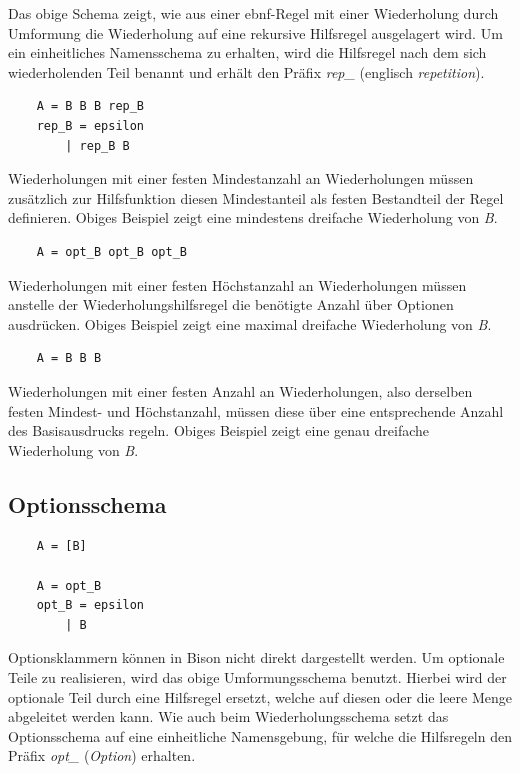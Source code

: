 \documentclass[oneside]{ausarbeitung}
\begin{document}
Das obige Schema zeigt, wie aus einer \ac{ebnf}-Regel mit einer Wiederholung durch Umformung die Wiederholung auf eine rekursive Hilfsregel ausgelagert wird. Um ein einheitliches Namensschema zu erhalten, wird die Hilfsregel nach dem sich wiederholenden Teil benannt und erhält den Präfix \textit{rep\_} (englisch \textit{repetition}).


\begin{lstlisting}
	A = B B B rep_B
	rep_B = epsilon
		| rep_B B
\end{lstlisting}

Wiederholungen mit einer festen Mindestanzahl an Wiederholungen müssen zusätzlich zur Hilfsfunktion diesen Mindestanteil als festen Bestandteil der Regel definieren. Obiges Beispiel zeigt eine mindestens dreifache Wiederholung von \textit{B}.


\begin{lstlisting}
	A = opt_B opt_B opt_B
\end{lstlisting}

Wiederholungen mit einer festen Höchstanzahl an Wiederholungen müssen anstelle der Wiederholungshilfsregel die benötigte Anzahl über Optionen ausdrücken. Obiges Beispiel zeigt eine maximal dreifache Wiederholung von \textit{B}.

\begin{lstlisting}
	A = B B B
\end{lstlisting}

Wiederholungen mit einer festen Anzahl an Wiederholungen, also derselben festen Mindest- und Höchstanzahl, müssen diese über eine entsprechende Anzahl des Basisausdrucks regeln. Obiges Beispiel zeigt eine genau dreifache Wiederholung von \textit{B}.

\subsection{Optionsschema}

\begin{lstlisting}
	A = [B]
	
	A = opt_B
	opt_B = epsilon
		| B
\end{lstlisting}

Optionsklammern können in Bison nicht direkt dargestellt werden. Um optionale Teile zu realisieren, wird das obige Umformungsschema benutzt. Hierbei wird der optionale Teil durch eine Hilfsregel ersetzt, welche auf diesen oder die leere Menge abgeleitet werden kann. Wie auch beim Wiederholungsschema setzt das Optionsschema auf eine einheitliche Namensgebung, für welche die Hilfsregeln den Präfix \textit{opt\_} (\textit{Option}) erhalten.
\end{document}
